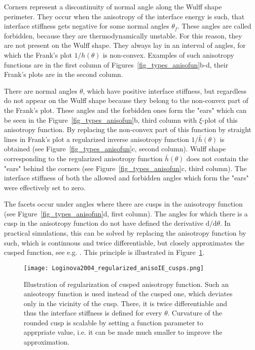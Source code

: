 Corners represent a discontinuity of normal angle along the Wulff shape perimeter. They occur when the anisotropy of the interface energy is such, that interface stiffness gets negative for some normal angles $\theta_f$. These angles are called forbidden, because they are thermodynamically unstable. For this reason, they are not present on the Wulff shape. They always lay in an interval of angles, for which the Frank's plot $1/h(\theta)$ is non-convex. Examples of such anisotropy functions are in the first column of Figures~\ref{fig_types_anisofun}b-d, their Frank's plots are in the second column.

There are normal angles $\theta$, which have positive interface stiffness, but regardless do not appear on the Wulff shape because they belong to the non-convex part of the Frank's plot. These angles and the forbidden ones form the "ears" which can be seen in the Figure~\ref{fig_types_anisofun}b, third column with $\xi$-plot of this anisotropy function. By replacing the non-convex part of this function by straight lines in Frank's plot a regularized inverse anisotropy function $1/\bar{h}(\theta)$ is obtained (see Figure~\ref{fig_types_anisofun}c, second column). Wulff shape corresponding to the regularized anisotropy function $\bar{h}(\theta)$ does not contain the "ears" behind the corners (see Figure~\ref{fig_types_anisofun}c, third column). The interface stiffness of both the allowed and forbidden angles which form the "ears" were effectively set to zero.

The facets occur under angles where there are cusps in the anisotropy function (see Figure~\ref{fig_types_anisofun}d, first column). The angles for which there is a cusp in the anisotropy function do not have defined the derivative $\mathrm{d}/\mathrm{d}\theta$. In practical simulations, this can be solved by replacing the anisotropy function by such, which is continuous and twice differentiable, but closely approximates the cusped function, see e.g. \cite{Debierre2003, Loginova2004}. This principle is illustrated in Figure~\ref{fig_regularized_anisoIE_cusps}.
\begin{figure}
	\centering
	\texttt{[image: Loginova2004\_regularized\_anisoIE\_cusps.png]}
	\caption[Illustration of regularization of cusped anisotropy function]{Illustration of regularization of cusped anisotropy function. Such an anisotropy function is used instead of the cusped one, which deviates only in the vicinity of the cusp. There, it is twice differentiable and thus the interface stiffness is defined for every $\theta$. Curvature of the rounded cusp is scalable by setting a function parameter to apprpriate value, i.e. it can be made much smaller to improve the approximation.}
	\label{fig_regularized_anisoIE_cusps}
\end{figure}

